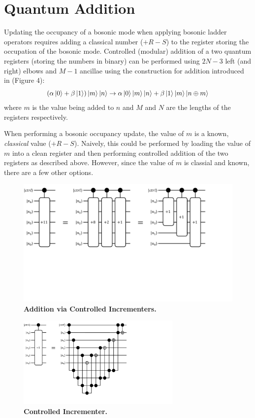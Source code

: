 \section{Quantum Addition}
\label{sec:addition}

Updating the occupancy of a bosonic mode when applying bosonic ladder operators requires adding a classical number ($+ R - S$) to the register storing the occupation of the bosonic mode.
Controlled (modular) addition of a two quantum registers (storing the numbers in binary) can be performed using $2N - 3$ left (and right) elbows and $M - 1$ ancillae using the construction for addition introduced in \cite{gidney2018halving} (Figure 4):
\begin{equation}
    (\alpha \ket{0} + \beta \ket{1})\ket{m}\ket{n} \rightarrow \alpha \ket{0}\ket{m}\ket{n} + \beta \ket{1}\ket{m}\ket{n \oplus m}
\end{equation}
where $m$ is the value being added to $n$ and $M$ and $N$ are the lengths of the registers respectively.

When performing a bosonic occupancy update, the value of $m$ is a known, \textit{classical} value ($+ R - S$).
Naively, this could be performed by loading the value of $m$ into a clean register and then performing controlled addition of the two registers as described above.
However, since the value of $m$ is classial and known, there are a few other options.

\begin{figure}
    \centering
    \includegraphics[width=16cm]{figures/addition-via-incrementers.pdf}
    \caption{
        \textbf{Addition via Controlled Incrementers.} 
    }
    \label{fig:addition-via-incrementers}
\end{figure}

\begin{figure}
    \centering
    \includegraphics[width=8cm]{figures/incrementer.pdf}
    \caption{
        \textbf{Controlled Incrementer.} 
    }
    \label{fig:incrementer}
\end{figure}


